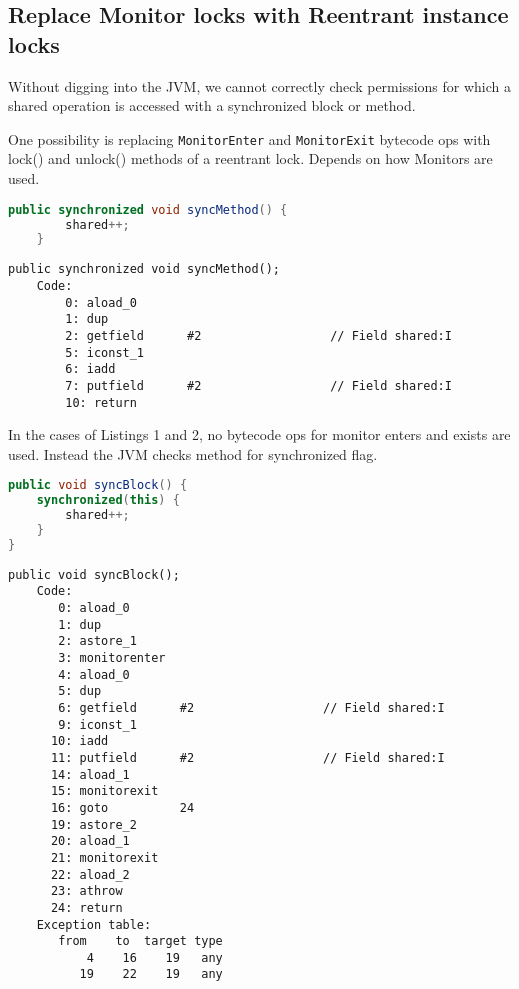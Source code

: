 \documentclass[9pt, twoside, a4paper]{article}
\begin{document}
    \subsection{Replace Monitor locks with Reentrant instance locks}
    Without digging into the JVM, we cannot correctly check permissions for which a shared operation is accessed
    with a synchronized block or method.

    One possibility is replacing \verb|MonitorEnter| and \verb|MonitorExit| bytecode ops with lock() and unlock() methods
    of a reentrant lock. Depends on how Monitors are used.

    \begin{lstlisting}[language=java, caption=Synchornized Method]
    public synchronized void syncMethod() {
        shared++;
    }
    \end{lstlisting}

    \begin{lstlisting}[language=JVMIS, caption=Bytecode for Listings 1]
public synchronized void syncMethod();
    Code:
        0: aload_0
        1: dup
        2: getfield      #2                  // Field shared:I
        5: iconst_1
        6: iadd
        7: putfield      #2                  // Field shared:I
        10: return
    \end{lstlisting}

    In the cases of Listings 1 and 2, no bytecode ops for monitor enters and exists are used.
    Instead the JVM checks method for synchronized flag.

    \begin{lstlisting}[language=java]
public void syncBlock() {
    synchronized(this) {
        shared++;
    }
}
    \end{lstlisting}

    \begin{lstlisting}[language=JVMIS]
public void syncBlock();
    Code:
       0: aload_0
       1: dup
       2: astore_1
       3: monitorenter
       4: aload_0
       5: dup
       6: getfield      #2                  // Field shared:I
       9: iconst_1
      10: iadd
      11: putfield      #2                  // Field shared:I
      14: aload_1
      15: monitorexit
      16: goto          24
      19: astore_2
      20: aload_1
      21: monitorexit
      22: aload_2
      23: athrow
      24: return
    Exception table:
       from    to  target type
           4    16    19   any
          19    22    19   any
    \end{lstlisting}
\end{document}
